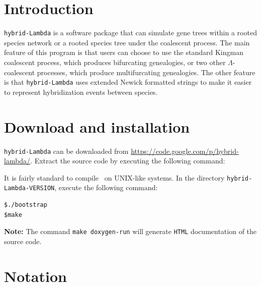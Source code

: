 

\section{Introduction}


{\tt hybrid-Lambda} is a software package that can simulate gene trees within a rooted species network or a rooted species tree under the coalescent process. The main feature of this program is that users can choose to use the standard Kingman coalescent process, which produces bifurcating genealogies, or two other $\Lambda$-coalescent processes, which produce multifurcating genealogies. The other feature is that {\tt hybrid-Lambda} uses extended Newick formatted strings to make it easier to represent hybridization events between species.

\vspace{1cm}

\begin{center}
%

\end{center}


\section{Download and installation}
{\tt hybrid-Lambda} can be downloaded from \url{https://code.google.com/p/hybrid-lambda/}. Extract the source code by executing the following command:

It is fairly standard to compile \hs~on UNIX-like systems. In the directory {\tt hybrid-Lambda-VERSION}, execute the following command:
\begin{verbatim}
$./bootstrap
$make
\end{verbatim}

{\bf Note:} The command {\tt make doxygen-run} will generate {\tt HTML} documentation of the source code.

\section{Notation}
